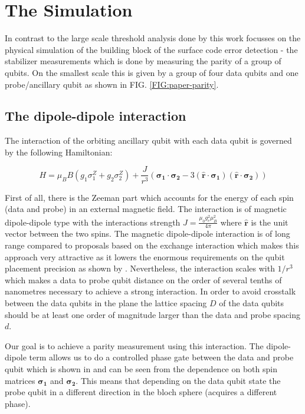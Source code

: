 \section{The Simulation}
In contrast to the large scale threshold analysis done by \citet{OGorman2016} this work focusses on the physical simulation of the building block of the surface code error detection - the stabilizer measurements which is done by measuring the parity of a group of qubits. On the smallest scale this is given by a group of four data qubits and one probe/ancillary qubit as shown in FIG. \ref{FIG:paper-parity}. 

\subsection{The dipole-dipole interaction}\label{sec:dipole-dipole}

The interaction of the orbiting ancillary qubit with each data qubit is governed by the following Hamiltonian:

\begin{equation*}
H = \mu_B B( g_1 \sigma_1^Z + g_2 \sigma_2^Z) + \frac{J}{r^3} ( \mathbf{\sigma_1} \cdot \mathbf{\sigma_2} - 3 ( \hat{\mathbf{r}} \cdot \mathbf{\sigma_1}) ( \hat{\mathbf{r}}\cdot \mathbf{\sigma_2}))
\end{equation*}

First of all, there is the Zeeman part which accounts for the energy of each spin (data and probe) in an external magnetic field. The interaction is of magnetic dipole-dipole type with the interactions strength $J=\frac{\mu_0 g_e^2 \mu_B^2}{4\pi}$ where $\hat{\mathbf{r}}$ is the unit vector between the two spins. The magnetic dipole-dipole interaction is of long range compared to proposals based on the exchange interaction \cite{Kane1998a} which makes this approach very attractive as it lowers the enormous requirements on the qubit placement precision as shown by \citet{OGorman2016}. Nevertheless, the interaction scales with $1/r^3$ which makes a data to probe qubit distance on the order of several tenths of nanometres necessary to achieve a strong interaction. In order to avoid crosstalk between the data qubits in the plane the lattice spacing $D$ of the data qubits should be at least one order of magnitude larger than the data and probe spacing $d$. 

Our goal is to achieve a parity measurement using this interaction. The dipole-dipole term allows us to do a controlled phase gate between the data and probe qubit which is shown in \cite{OGorman2016} and can be seen from the dependence on both spin matrices $\mathbf{\sigma_1}$ and $\mathbf{\sigma_2}$. This means that depending on the data qubit state the probe qubit in a different direction in the bloch sphere (acquires a different phase). 

